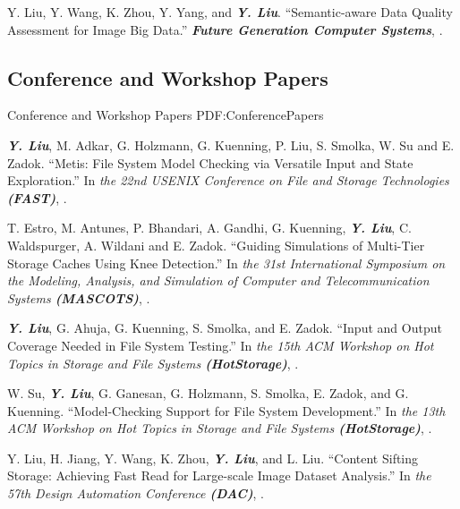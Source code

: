 \documentclass[a4paper,10pt,oneside]{article}
\begin{document}
\begin{body}
\NumberedItem{[3]}
Y. Liu, Y. Wang, K. Zhou, Y. Yang, and \textbf{\textit{Y. Liu}}.
``Semantic-aware Data Quality Assessment for Image Big Data.'' 
\textit{\textbf{Future Generation Computer Systems}},
.

\subsection
{Conference and Workshop Papers}
{Conference and Workshop Papers}
{PDF:ConferencePapers}

\NumberedItem{[1]}
\textbf{\textit{Y. Liu}}, M. Adkar, G. Holzmann, G. Kuenning, P. Liu, S. Smolka, W. Su and E. Zadok.
``Metis: File System Model Checking via Versatile Input and State Exploration.''
In \textit{the 22nd USENIX Conference on File and Storage Technologies
\textbf{(FAST)}}, %
. 

\NumberedItem{[2]}
T. Estro, M. Antunes, P. Bhandari, A. Gandhi, G. Kuenning, \textbf{\textit{Y. Liu}}, C. Waldspurger, A. Wildani and E. Zadok.
``Guiding Simulations of Multi-Tier Storage Caches Using Knee Detection.''
In \textit{the 31st International Symposium on the Modeling, Analysis, and Simulation of Computer and Telecommunication Systems \textbf{(MASCOTS)}}, %
. 

\Gap

\NumberedItem{[3]}
\textbf{\textit{Y. Liu}}, G. Ahuja, G. Kuenning, S. Smolka, and E. Zadok.
``Input and Output Coverage Needed in File System Testing.''
In \textit{the 15th ACM Workshop on Hot Topics in Storage and File Systems \textbf{(HotStorage)}}, %
.


\NumberedItem{[4]}
W. Su, \textbf{\textit{Y. Liu}}, G. Ganesan, G. Holzmann, S. Smolka, E. Zadok, and G. Kuenning.
``Model-Checking Support for File System Development.''
In \textit{the 13th ACM Workshop on Hot Topics in Storage and File Systems \textbf{(HotStorage)}}, %
.


\NumberedItem{[5]}
Y. Liu, H. Jiang, Y. Wang, K. Zhou, \textbf{\textit{Y. Liu}}, and L. Liu.
``Content Sifting Storage: Achieving Fast Read for Large-scale Image Dataset Analysis.''
In \textit{the 57th Design Automation Conference \textbf{(DAC)}}, %
.


\end{body}
\end{document}
